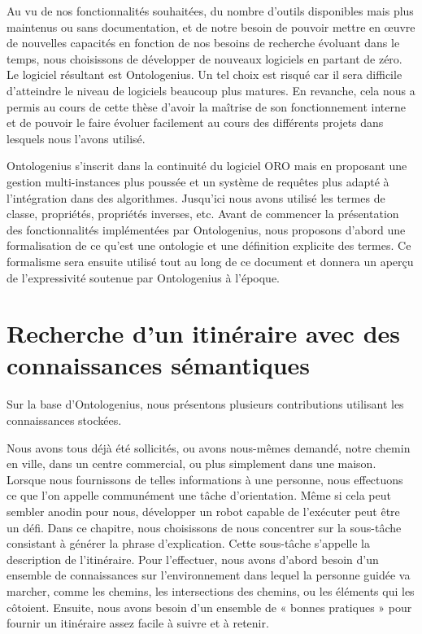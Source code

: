 Au vu de nos fonctionnalités souhaitées, du nombre d'outils disponibles mais plus maintenus ou sans documentation, et de notre besoin de pouvoir mettre en œuvre de nouvelles capacités en fonction de nos besoins de recherche évoluant dans le temps, nous choisissons de développer de nouveaux logiciels en partant de zéro. Le logiciel résultant est Ontologenius. Un tel choix est risqué car il sera difficile d'atteindre le niveau de logiciels beaucoup plus matures. En revanche, cela nous a permis au cours de cette thèse d'avoir la maîtrise de son fonctionnement interne et de pouvoir le faire évoluer facilement au cours des différents projets dans lesquels nous l'avons utilisé.

Ontologenius s'inscrit dans la continuité du logiciel ORO mais en proposant une gestion multi-instances plus poussée et un système de requêtes plus adapté à l'intégration dans des algorithmes. Jusqu'ici nous avons utilisé les termes de classe, propriétés, propriétés inverses, etc. Avant de commencer la présentation des fonctionnalités implémentées par Ontologenius, nous proposons d'abord une formalisation de ce qu'est une ontologie et une définition explicite des termes. Ce formalisme sera ensuite utilisé tout au long de ce document et donnera un aperçu de l'expressivité soutenue par Ontologenius à l'époque. 

\section*{Recherche d'un itinéraire avec des connaissances sémantiques}

Sur la base d'Ontologenius, nous présentons plusieurs contributions utilisant les connaissances stockées.

Nous avons tous déjà été sollicités, ou avons nous-mêmes demandé, notre chemin en ville, dans un centre commercial, ou plus simplement dans une maison. Lorsque nous fournissons de telles informations à une personne, nous effectuons ce que l'on appelle communément une tâche d'orientation. Même si cela peut sembler anodin pour nous, développer un robot capable de l'exécuter peut être un défi. Dans ce chapitre, nous choisissons de nous concentrer sur la sous-tâche consistant à générer la phrase d'explication. Cette sous-tâche s'appelle la description de l'itinéraire. Pour l'effectuer, nous avons d'abord besoin d'un ensemble de connaissances sur l'environnement dans lequel la personne guidée va marcher, comme les chemins, les intersections des chemins, ou les éléments qui les côtoient. Ensuite, nous avons besoin d'un ensemble de « bonnes pratiques » pour fournir un itinéraire assez facile à suivre et à retenir.

